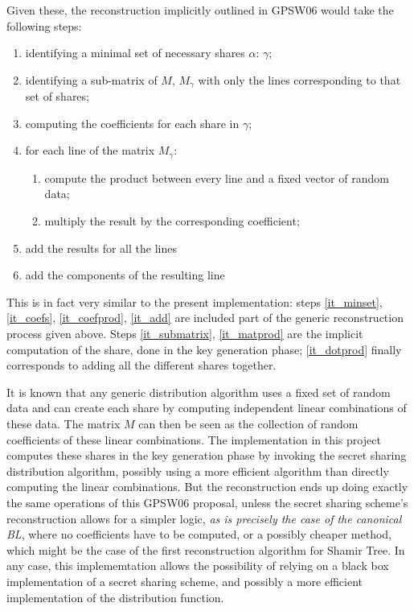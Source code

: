 \documentclass{article}
\begin{document}
Given these, the reconstruction implicitly outlined in GPSW06 would take the following steps:
\begin{enumerate}
\item \label{it_minset} identifying a minimal set of necessary shares $\alpha$: $\gamma$;
\item \label{it_submatrix}identifying a sub-matrix of $M$, $M_\gamma$ with only the lines corresponding to that set of shares;
\item \label{it_coefs}computing the coefficients for each share in $\gamma$;
\item for each line of the matrix $M_\gamma$:
\begin{enumerate}
	\item \label{it_matprod} compute the product between every line  and a fixed vector of random data; 
	\item \label{it_coefprod}multiply the result by the corresponding coefficient;
\end{enumerate}
\item \label{it_add} add the results for all the lines
\item \label{it_dotprod} add the components of the resulting line
\end{enumerate}

This is in fact very similar to the present implementation: steps \ref{it_minset}, \ref{it_coefs}, \ref{it_coefprod}, \ref{it_add} are included part of the generic reconstruction process given above. Steps \ref{it_submatrix}, \ref{it_matprod} are the implicit computation of the share, done in the key generation phase; \ref{it_dotprod} finally corresponds to adding all the different shares together.

It is known that any generic distribution algorithm uses a fixed set of random data and can create each share by computing independent linear combinations of these data. The matrix $M$ can then be seen as the collection of random coefficients of these linear combinations. The implementation in this project computes these shares in the key generation phase by invoking the secret sharing distribution algorithm, possibly using a more efficient algorithm than directly computing the linear combinations. But the reconstruction ends up doing exactly the same operations of this GPSW06 proposal, unless the secret sharing scheme's reconstruction allows for a simpler logic, \emph{as is precisely the case of the canonical BL}, where no coefficients have to be computed, or a possibly cheaper method, which might be the case of the first reconstruction algorithm for Shamir Tree. 
In any case, this implememtation allows the possibility of relying on a black box implementation of a secret sharing scheme, and possibly a more efficient implementation of the distribution function.
\end{document}

